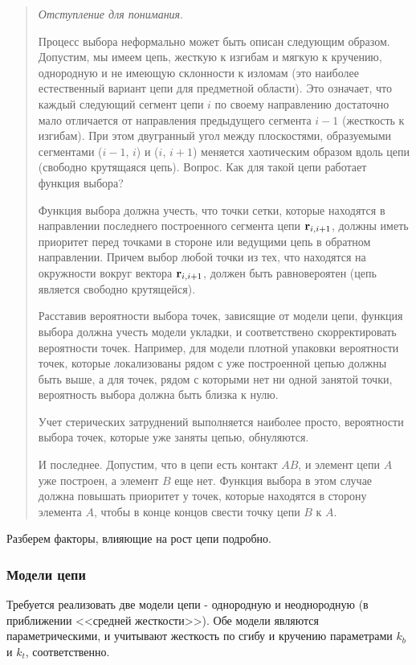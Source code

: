 \documentclass[tikz,a4paper]{scrartcl} %
\begin{document}
\begin{quote} \textit{Отступление для понимания}. 

Процесс выбора неформально может быть описан следующим образом. Допустим, мы имеем цепь, жесткую к изгибам и мягкую к кручению, однородную и не имеющую склонности к изломам (это наиболее естественный вариант цепи для предметной области). Это означает, что каждый следующий сегмент цепи $i$ по своему направлению достаточно мало отличается от направления предыдущего сегмента $i-1$ (жесткость к изгибам). При этом двугранный угол между плоскостями, образуемыми сегментами ($i-1$, $i$) и ($i$, $i+1$) меняется хаотическим образом вдоль цепи (свободно крутящаяся цепь). Вопрос. Как для такой цепи работает функция выбора?

Функция выбора должна учесть, что точки сетки, которые находятся в направлении последнего построенного сегмента цепи $\bold r_{i,i+1}$, должны иметь приоритет перед точками в стороне или ведущими цепь в обратном направлении. Причем выбор любой точки из тех, что находятся на окружности вокруг вектора $\bold r_{i,i+1}$, должен быть равновероятен (цепь является свободно крутящейся). 

Расставив вероятности выбора точек, зависящие от модели цепи, функция выбора должна учесть модели укладки, и соответствено скорректировать вероятности точек. Например, для модели плотной упаковки вероятности точек, которые локализованы рядом с уже построенной цепью должны быть выше, а для точек, рядом с которыми нет ни одной занятой точки, вероятность выбора должна быть близка к нулю.

Учет стерических затруднений выполняется наиболее просто, вероятности выбора точек, которые уже заняты цепью, обнуляются.

И последнее. Допустим, что в цепи есть контакт $AB$, и элемент цепи $A$ уже построен, а элемент $B$ еще нет. Функция выбора в этом случае должна повышать приоритет у точек, которые находятся в сторону элемента $A$, чтобы в конце концов свести точку цепи $B$ к $A$.

\end{quote}

Разберем факторы, влияющие на рост цепи подробно.
\subsubsection*{Модели цепи}
Требуется реализовать две модели цепи - однородную и неоднородную (в приближении <<средней жесткости>>). Обе модели являются параметрическими, и учитывают жесткость по сгибу и кручению параметрами $k_b$ и $k_t$, соответственно. 
\end{document}

